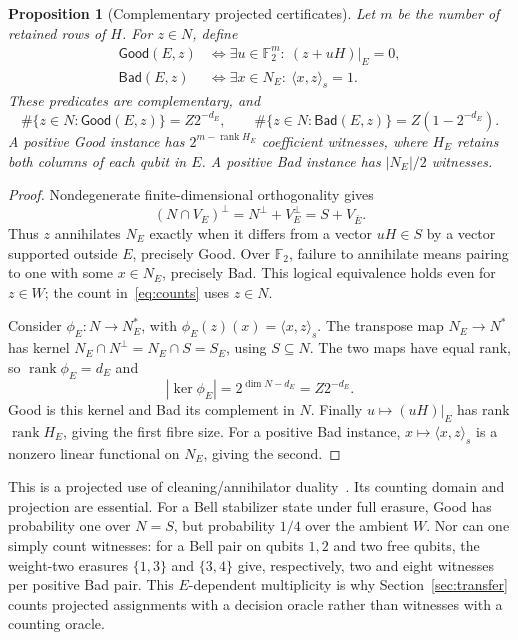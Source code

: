 \documentclass[11pt]{article}
\newtheorem{proposition}[theorem]{Proposition}
\theoremstyle{remark}
\newcommand{\F}{\mathbb F_2}
\newcommand{\Good}{\mathsf{Good}}
\newcommand{\Bad}{\mathsf{Bad}}
\newcommand{\rank}{\operatorname{rank}}
\newcommand{\pair}[2]{\langle #1,#2\rangle_s}
\begin{document}
\begin{proposition}[Complementary projected certificates]\label{prop:cert}
Let \(m\) be the number of retained rows of \(H\). For \(z\in N\), define
\begin{align*}
 \Good(E,z)&\iff
    \exists u\in\F^m:\ (z+uH)|_E=0,\\
 \Bad(E,z)&\iff
    \exists x\in N_E:\ \pair{x}{z}=1.
\end{align*}
These predicates are complementary, and
\begin{equation}\label{eq:counts}
 \#\{z\in N:\Good(E,z)\}=Z2^{-d_E},\qquad
 \#\{z\in N:\Bad(E,z)\}=Z(1-2^{-d_E}).
\end{equation}
A positive Good instance has \(2^{m-\rank H_E}\) coefficient witnesses,
where \(H_E\) retains both columns of each qubit in \(E\).
A positive Bad instance has \(|N_E|/2\) witnesses.
\end{proposition}
\begin{proof}
Nondegenerate finite-dimensional orthogonality gives
\[
 (N\cap V_E)^\perp=N^\perp+V_E^\perp=S+V_{\bar E}.
\]
Thus \(z\) annihilates \(N_E\) exactly when it differs from a vector
\(uH\in S\) by a vector supported outside \(E\), precisely Good.
Over \(\F\), failure to annihilate means pairing to one with some
\(x\in N_E\), precisely Bad. This logical equivalence holds even for
\(z\in W\); the count in~\eqref{eq:counts} uses \(z\in N\).

Consider \(\phi_E:N\to N_E^*\), with
\(\phi_E(z)(x)=\pair{x}{z}\). The transpose map \(N_E\to N^*\) has
kernel \(N_E\cap N^\perp=N_E\cap S=S_E\), using \(S\subseteq N\).
The two maps have equal rank, so \(\rank\phi_E=d_E\) and
\[
 |\ker\phi_E|=2^{\dim N-d_E}=Z2^{-d_E}.
\]
Good is this kernel and Bad its complement in \(N\).
Finally \(u\mapsto(uH)|_E\) has rank \(\rank H_E\), giving the
first fibre size. For a positive Bad instance,
\(x\mapsto\pair{x}{z}\) is a nonzero linear functional on \(N_E\),
giving the second.
\end{proof}

This is a projected use of cleaning/annihilator
duality~\cite{bravyiterhal2009,kalachevsadov2022}.
Its counting domain and projection are essential. For a Bell stabilizer
state under full erasure, Good has probability one over \(N=S\), but
probability \(1/4\) over the ambient \(W\). Nor can one simply count
witnesses: for a Bell pair on qubits \(1,2\) and two free qubits,
the weight-two erasures \(\{1,3\}\) and \(\{3,4\}\) give, respectively,
two and eight witnesses per positive Bad pair. This \(E\)-dependent
multiplicity is why Section~\ref{sec:transfer} counts projected
assignments with a decision oracle rather than witnesses with a counting
oracle.
\end{document}

